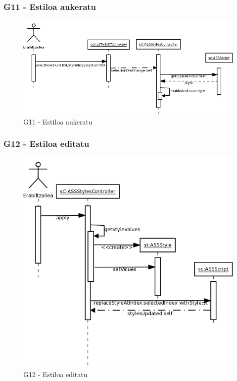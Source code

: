 \subsubsection{G11 - Estiloa aukeratu}
\begin{figure}[htp]
\begin{center}
\includegraphics[scale=0.35]{Pictures/Chapter4/Diseinua/G11.png}
\caption{G11 - Estiloa aukeratu}
\label{g11d}
\end{center}
\end{figure}

\newpage
\subsubsection{G12 - Estiloa editatu}
\begin{figure}[htp]
\begin{center}
\includegraphics[scale=0.3]{Pictures/Chapter4/Diseinua/G12.png}
\caption{G12 - Estiloa editatu}
\label{g12d}
\end{center}
\end{figure}


